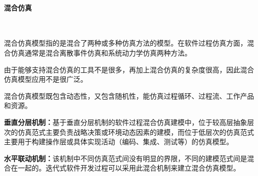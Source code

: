 \paragraph{混合仿真}~{} \par
混合仿真模型指的是混合了两种或多种仿真方法的模型。在软件过程仿真方面，混合仿真通常是混合离散事件仿真和系统动力学仿真两种方法。

由于能够支持混合仿真的工具不是很多，再加上混合仿真的复杂度很高，因此混合仿真模型应用不是很广泛。

混合仿真模型既包含动态性，又包含随机性，能仿真过程循环、过程流、工作产品和资源。

\textbf{垂直分层机制：}基于垂直分层机制的软件过程混合仿真建模中，位于较高层抽象层次的仿真范式主要负责战略决策或环境动态因素的建模，而位于低层次的仿真范式主要用于构建操作层或具体实现活动（编码、集成、测试等）的仿真模型。

\textbf{水平联动机制：}该机制中不同仿真范式间没有明显的界限，不同的建模范式间是混合在一起的。迭代式软件开发过程可以采用此混合机制来建立混合仿真模型。